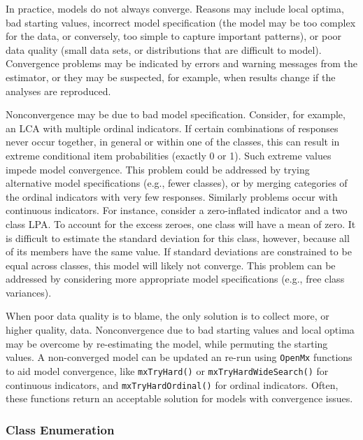\documentclass[
  ,man,floatsintext]{apa6}
\begin{document}
In practice, models do not always converge.
Reasons may include local optima,
bad starting values,
incorrect model specification (the model may be too complex for the data, or conversely, too simple to capture important patterns),
or poor data quality (small data sets, or distributions that are difficult to model).
Convergence problems may be indicated by errors and warning messages from the estimator,
or they may be suspected, for example,
when results change if the analyses are reproduced.

Nonconvergence may be due to bad model specification.
Consider, for example, an LCA with multiple ordinal indicators.
If certain combinations of responses never occur together,
in general or within one of the classes,
this can result in extreme conditional item probabilities (exactly 0 or 1).
Such extreme values impede model convergence.
This problem could be addressed by trying alternative model specifications (e.g., fewer classes),
or by merging categories of the ordinal indicators with very few responses.
Similarly problems occur with continuous indicators.
For instance, consider a zero-inflated indicator and a two class LPA.
To account for the excess zeroes, one class will have a mean of zero.
It is difficult to estimate the standard deviation for this class, however, because all of its members have the same value.
If standard deviations are constrained to be equal across classes,
this model will likely not converge.
This problem can be addressed by considering more appropriate model specifications (e.g., free class variances).

When poor data quality is to blame, the only solution is to collect more, or higher quality, data.
Nonconvergence due to bad starting values and local optima may be overcome by re-estimating the model, while permuting the starting values.
A non-converged model can be updated an re-run using \texttt{OpenMx} functions to aid model convergence,
like \texttt{mxTryHard()} or \texttt{mxTryHardWideSearch()} for continuous indicators, and \texttt{mxTryHardOrdinal()} for ordinal indicators.
Often, these functions return an acceptable solution for models with convergence issues.

\hypertarget{class-enumeration-1}{%
\subsubsection{Class Enumeration}\label{class-enumeration-1}}
\end{document}
